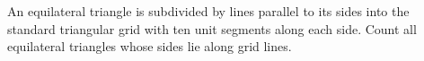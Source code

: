 An equilateral triangle is subdivided by lines parallel to its sides into the standard triangular grid with ten unit segments along each side. Count all equilateral triangles whose sides lie along grid lines.
